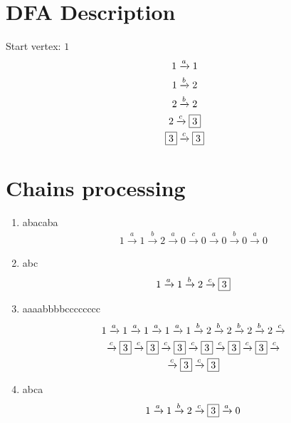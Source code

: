 \documentclass[12pt]{article}
\begin{document}
 
\section* {DFA Description} 
Start vertex: $1$
\begin {equation*} 
\begin {gathered} 
1 \xrightarrow{a} 1\\1 \xrightarrow{b} 2\\2 \xrightarrow{b} 2\\2 \xrightarrow{c} \fbox{3}\\\fbox{3} \xrightarrow{c} \fbox{3}\\
\end {gathered} 
\end {equation*} 
\section* {Chains processing} 
\begin {enumerate} 
\item abacaba
\begin {equation*} 
\begin {gathered} 
1 \xrightarrow{a} 1 \xrightarrow{b} 2 \xrightarrow{a} 0 \xrightarrow{c} 0 \xrightarrow{a} 0 \xrightarrow{b} 0 \xrightarrow{a} 0
\end {gathered} 
\end {equation*} 

\item abc
\begin {equation*} 
\begin {gathered} 
1 \xrightarrow{a} 1 \xrightarrow{b} 2 \xrightarrow{c} \fbox{3}
\end {gathered} 
\end {equation*} 

\item aaaabbbbcccccccc
\begin {equation*} 
\begin {gathered} 
1 \xrightarrow{a} 1 \xrightarrow{a} 1 \xrightarrow{a} 1 \xrightarrow{a} 1 \xrightarrow{b} 2 \xrightarrow{b} 2 \xrightarrow{b} 2 \xrightarrow{b} 2 \xrightarrow{c} \\
 \xrightarrow{c} \fbox{3} \xrightarrow{c} \fbox{3} \xrightarrow{c} \fbox{3} \xrightarrow{c} \fbox{3} \xrightarrow{c} \fbox{3} \xrightarrow{c} \fbox{3} \xrightarrow{c} \\
 \xrightarrow{c} \fbox{3} \xrightarrow{c} \fbox{3}
\end {gathered} 
\end {equation*} 

\item abca
\begin {equation*} 
\begin {gathered} 
1 \xrightarrow{a} 1 \xrightarrow{b} 2 \xrightarrow{c} \fbox{3} \xrightarrow{a} 0
\end {gathered} 
\end {equation*} 

\end {enumerate}
\end{document}
